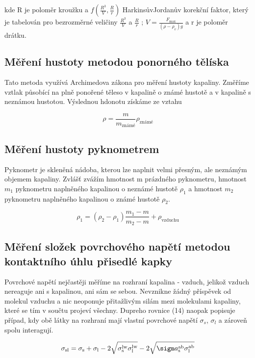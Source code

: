 \documentclass[a4paper,11pt]{article}
\begin{document}
\noindent
kde R je poloměr kroužku a $f (\frac{R^3}{V}, \frac{R}{r})$ HarkinsůvJordanův korekční faktor, který je tabelován pro bezrozměrné veličiny $\frac{R^3}{V}$ a $\frac{R}{r}$ ; $V=\frac{F_{\text{max}}}{(\rho - \rho_v)g}$ a r je poloměr drátku.

\subsection{Měření hustoty metodou ponorného tělíska}

Tato metoda využívá Archimedova zákona pro měření hustoty kapaliny. Změříme vztlak působící na plně ponořené těleso v kapalině o známé hustotě a v kapalině s neznámou hustotou. Výslednou hdonotu získáme ze vztahu

\begin{equation}
  \rho = \frac{m}{m_{\text{známé}}} \rho_{\text{známé}}
\end{equation}

\subsection{Měření hustoty pyknometrem}

Pyknometr je skleněná nádoba, kterou lze naplnit velmi přesným, ale neznámým objemem kapaliny. Zvlášť zvážím hmotnost m prázdného pyknometru, hmotnost $m_1$ pyknometru naplněného kapalinou o neznámé hustotě $\rho_1$ a hmotnost $m_2$ pyknometru naplněného kapalinou o známé hustotě $\rho_2$.

\begin{equation}
  \rho_1 = (\rho_2 - \rho_1) \frac{m_1 - m}{m_2 - m} + \rho_{\text{vzduchu}}
\end{equation}

\subsection{Měření složek povrchového napětí metodou kontaktního úhlu přisedlé kapky}

Povrchové napětí nejčastěji měříme na rozhraní kapalina - vzduch, jelikož vzduch nereaguje ani s kapalinou, ani sám se sebou. Nevznikne žádný příspěvek od molekul vzduchu a nic neoponuje přitažlivým silám mezi molekulami kapaliny, které se tím v součtu projeví všechny. Dupreho rovnice (14) naopak popisuje případ, kdy obě látky na rozhraní mají vlastní povrchové napětí $
\sigma_s$,  $\sigma_l$ a zároveň spolu interagují.

\begin{equation}
  \sigma_{\text{sl}} =
  \sigma_{\text{s}} + \sigma_{\text{l}} - 2 \sqrt{\sigma_{\text{s}}^{\text{lw}}\sigma_{\text{l}}^{\text{lw}}} - 2\sqrt{\sigm
a_{\text{s}}^{\text{ab}}\sigma_{\text{l}}^{\text{ab}}} \\
\end{equation}
\end{document}
